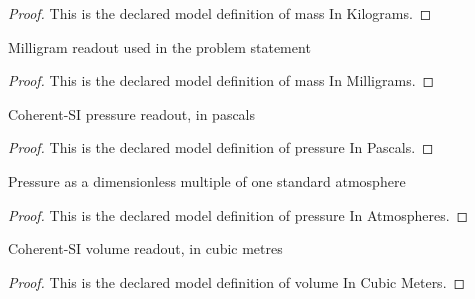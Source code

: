 \begin{proof}
  This is the declared model definition of mass In Kilograms.
\end{proof}
\begin{definition}
  \label{def:physics:phyx-mini-0432:phyxminiproblems-problemphyxmini0432-massinmilligrams}
  Milligram readout used in the problem statement
\end{definition}
\begin{proof}
  This is the declared model definition of mass In Milligrams.
\end{proof}
\begin{definition}
  \label{def:physics:phyx-mini-0432:phyxminiproblems-problemphyxmini0432-pressureinpascals}
  Coherent-SI pressure readout, in pascals
\end{definition}
\begin{proof}
  This is the declared model definition of pressure In Pascals.
\end{proof}
\begin{definition}
  \label{def:physics:phyx-mini-0432:phyxminiproblems-problemphyxmini0432-pressureinatmospheres}
  Pressure as a dimensionless multiple of one standard atmosphere
\end{definition}
\begin{proof}
  This is the declared model definition of pressure In Atmospheres.
\end{proof}
\begin{definition}
  \label{def:physics:phyx-mini-0432:phyxminiproblems-problemphyxmini0432-volumeincubicmeters}
  Coherent-SI volume readout, in cubic metres
\end{definition}
\begin{proof}
  This is the declared model definition of volume In Cubic Meters.
\end{proof}
